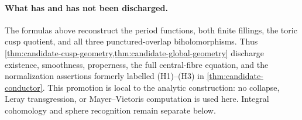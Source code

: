 \paragraph{What has and has not been discharged.}
The formulas above reconstruct the period functions, both finite fillings,
the toric cusp quotient, and all three punctured-overlap biholomorphisms.
Thus \cref{thm:candidate-cusp-geometry,thm:candidate-global-geometry}
discharge existence, smoothness, properness,
the full central-fibre equation, and the normalization assertions formerly
labelled (H1)--(H3) in \cref{thm:candidate-conductor}.  This promotion is
local to the analytic construction: no collapse, Leray transgression, or
Mayer--Vietoris computation is used here.  Integral cohomology and sphere
recognition remain separate below.
